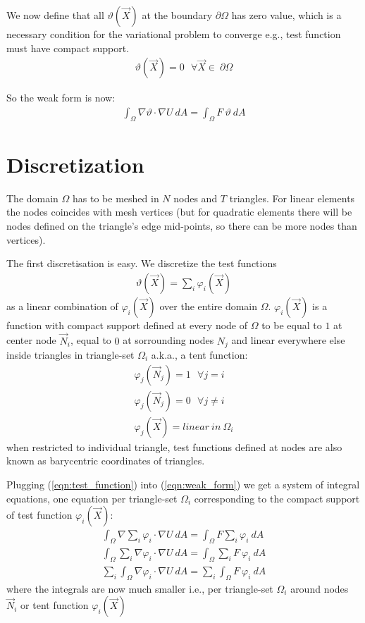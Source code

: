 \documentclass{birkjour}
\numberwithin{equation}{section}
\begin{document}
We now define that all $\vartheta(\vec X)$ at the boundary $\partial \Omega$ has zero value, 
which is a necessary condition for the variational problem to converge e.g., test function must have compact support.
\begin{eqnarray}
	\vartheta(\vec X) = 0  \ \ \  \forall \vec X \in \ \partial \Omega
\end{eqnarray}
 
So the weak form is now:
\begin{eqnarray}
	\label{eqn:weak_form}
	\int_{\Omega}{ \nabla \vartheta \cdot \nabla U  \ dA} = \int_{\Omega} { F \ \vartheta  \ dA }
\end{eqnarray}


\section{Discretization}
\label{sec:discretization} 

The domain $\Omega$ has to be meshed in $N$ nodes and $T$ triangles. For linear elements the nodes coincides with 
mesh vertices (but for quadratic elements there will be nodes defined on the triangle's edge mid-points, 
so there can be more nodes than vertices).

The first discretisation is easy. We discretize the test functions 
\begin{eqnarray}
	\label{eqn:test_function}
	\vartheta(\vec X) = \sum_i { \varphi_i(\vec X) }
\end{eqnarray} 
as a linear combination of $\varphi_i(\vec X)$ over the entire domain $\Omega$. $\varphi_i(\vec X)$ is a function with compact support 
defined at every node of $\Omega$ to be equal to $1$ at center node $\vec N_i$, equal to $0$ at 
sorrounding nodes $N_j$ and linear everywhere else inside triangles in triangle-set $\Omega_i$ a.k.a., a tent function:
\begin{eqnarray}
	\varphi_j(\vec N_j) = 1 \ \ \  \forall j = i \nonumber\\
	\varphi_j(\vec N_j) = 0 \ \ \  \forall j \neq i \nonumber\\
	\varphi_j(\vec X) = linear \ in \ \Omega_i \nonumber
\end{eqnarray}
when restricted to individual triangle, test functions defined at nodes are also known as barycentric coordinates of triangles.

Plugging (\ref{eqn:test_function}) into (\ref{eqn:weak_form}) we get a system of integral equations, 
one equation per triangle-set $\Omega_i$ corresponding to the compact
support of test function $\varphi_i(\vec X)$:
\begin{eqnarray}
	\int_{\Omega}{ \nabla \sum_i { \varphi_i } \cdot \nabla U\ dA} = \int_{\Omega} { F \sum_i {\varphi_i} \ dA } \nonumber\\
	\int_{\Omega}{\sum_i { \nabla \varphi_i \cdot \nabla U} \ dA} = \int_{\Omega} { \sum_i {F \ \varphi_i} \ dA } \nonumber\\
	\sum_i { \int_{\Omega}{ \nabla \varphi_i \cdot \nabla U \ dA}} = \sum_i { \int_{\Omega} { F \ \varphi_i} \ dA } \nonumber	
\end{eqnarray}
where the integrals are now much smaller i.e., per triangle-set $\Omega_i$ around nodes $\vec N_i$ or tent function $\varphi_i(\vec X)$
\end{document}
